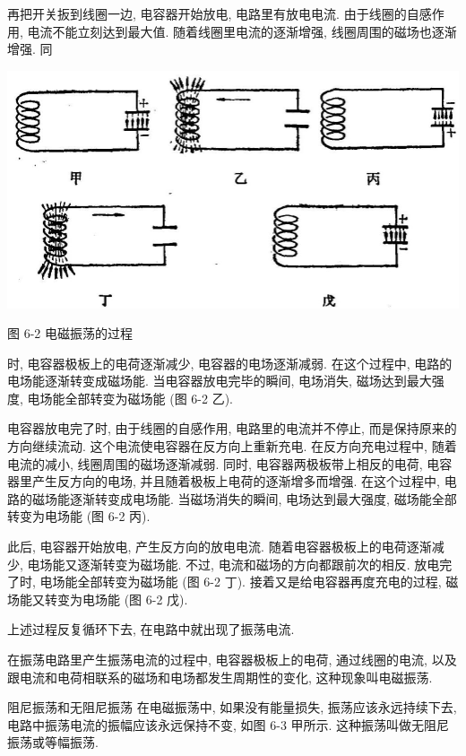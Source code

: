 \documentclass[10pt]{article}
\begin{document}
再把开关扳到线圈一边, 电容器开始放电, 电路里有放电电流. 由于线圈的自感作用, 电流不能立刻达到最大值. 随着线圈里电流的逐渐增强, 线圈周围的磁场也逐渐增强. 同

\begin{center}
\includegraphics[max width=1.0\textwidth]{images/01913056-1f15-74d8-9184-9aab52c9d66b_194_281193.jpg}
\end{center}

图 6-2 电磁振荡的过程

时, 电容器极板上的电荷逐渐减少, 电容器的电场逐渐减弱. 在这个过程中, 电路的电场能逐渐转变成磁场能. 当电容器放电完毕的瞬间, 电场消失, 磁场达到最大强度, 电场能全部转变为磁场能 (图 6-2 乙).

电容器放电完了时, 由于线圈的自感作用, 电路里的电流并不停止, 而是保持原来的方向继续流动. 这个电流使电容器在反方向上重新充电. 在反方向充电过程中, 随着电流的减小, 线圈周围的磁场逐渐减弱. 同时, 电容器两极板带上相反的电荷, 电容器里产生反方向的电场, 并且随着极板上电荷的逐渐增多而增强. 在这个过程中, 电路的磁场能逐渐转变成电场能. 当磁场消失的瞬间, 电场达到最大强度, 磁场能全部转变为电场能 (图 6-2 丙).

此后, 电容器开始放电, 产生反方向的放电电流. 随着电容器极板上的电荷逐渐减少, 电场能又逐渐转变为磁场能. 不过, 电流和磁场的方向都跟前次的相反. 放电完了时, 电场能全部转变为磁场能 (图 6-2 丁). 接着又是给电容器再度充电的过程, 磁场能又转变为电场能 (图 6-2 戊).

上述过程反复循环下去, 在电路中就出现了振荡电流.

在振荡电路里产生振荡电流的过程中, 电容器极板上的电荷, 通过线圈的电流, 以及跟电流和电荷相联系的磁场和电场都发生周期性的变化, 这种现象叫电磁振荡.

阻尼振荡和无阻尼振荡 在电磁振荡中, 如果没有能量损失, 振荡应该永远持续下去, 电路中振荡电流的振幅应该永远保持不变, 如图 6-3 甲所示. 这种振荡叫做无阻尼振荡或等幅振荡.
\end{document}
